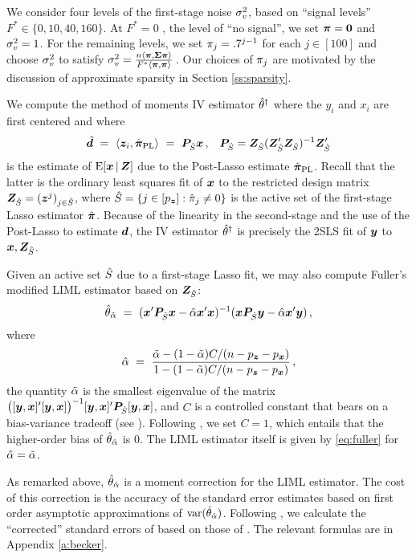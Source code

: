 \documentclass{uwstat572}
\newcommand{\be}{\begin{equation}}
\newcommand{\ee}{\end{equation}}
\newcommand{\benn}{\begin{equation*}}
\newcommand{\eenn}{\end{equation*}}
\theoremstyle{definition}
\theoremstyle{remark}
\newcommand{\E}{\mathrm{E}}
\newcommand{\En}{\mathbb{E}_n}
\newcommand{\var}{\mathrm{var}}
\numberwithin{equation}{section}
\begin{document}
We consider four levels of the first-stage noise $\sigma_v^2$, based on ``signal levels'' $F^* \in \{0, 10, 40, 160\}$. At $F^* = 0$ , the level of ``no signal'', we set $\boldsymbol{\pi} = \boldsymbol{0}$ and $\sigma_v^2 = 1$. For the remaining levels, we set $\pi_j = .7^{j-1}$ for each $j\in[100]$ and choose $\sigma_v^2$ to satisfy $\sigma_v^2 = \frac{n\langle\boldsymbol{\pi}, \boldsymbol{\Sigma}\boldsymbol{\pi} \rangle}{F^*\langle\boldsymbol{\pi}, \boldsymbol{\pi} \rangle}$\,. Our choices of $\pi_j$ are motivated by the discussion of approximate sparsity in Section \ref{ss:sparsity}. 


We compute the method of moments IV estimator $\hat{\theta}^\dagger$
where the $y_i$ and $x_i$ are first centered and where
\vspace{-.7em}
\begin{align*}
 	\hat{\boldsymbol{d}} \ = \ \langle\boldsymbol{z}_i, \hat{\boldsymbol{\pi}}_{\mathrm{PL}}\rangle \ & = \ \boldsymbol{P}_{\hat{S}}\boldsymbol{x}\,, 
	 & \boldsymbol{P}_{\hat{S}} = \boldsymbol{Z}_{\hat{S}} (\boldsymbol{Z}_{\hat{S}}'\boldsymbol{Z}_{\hat{S}})^{-1}\boldsymbol{Z}_{\hat{S}}' 
\end{align*}
is the estimate of $\E[\x\,|\,\Z]$ due to the Post-Lasso estimate $\hat{\boldsymbol{\pi}}_{\mathrm{PL}}$. Recall that the latter is the ordinary least squares fit of $\boldsymbol{x}$ to the restricted design matrix $\boldsymbol{Z}_{\hat{S}} = (\boldsymbol{z}^j)_{j \in \hat{S}}$, where $\hat{S} = \{j\in[{p_{\boldsymbol{z}}}] : \hat{\pi}_j \neq 0\}$ is the active set of the first-stage Lasso estimator $\hat{\boldsymbol{\pi}}$. Because of the linearity in the second-stage and the use of the Post-Lasso to estimate $\boldsymbol{d}$, the IV estimator $\hat{\theta}^\dagger$ is precisely the 2SLS fit of $\boldsymbol{y}$ to $\boldsymbol{x}, \boldsymbol{Z}_{\hat{S}}$. 

Given an active set $\hat{S}$ due to a first-stage Lasso fit, we may also compute Fuller's modified LIML estimator based on $\boldsymbol{Z}_{\hat{S}}$: 
\be\label{eq:fuller}
	\rtfl \ = \ (\x' \PS\x - \fga\x'\x)^{-1}(\x \PS\y - \fga\x'\y) \,,
\ee
where
\be\label{eq:fga}
	\fga \ = \ \frac{\lga - (1 - \lga) C / (n - \pz - \px)}{1 - (1 - \lga) C / (n - \pz - \px)} \,,
\ee
\vspace{.2em}the quantity $\tilde{\alpha}$ is the smallest eigenvalue of the matrix $\big([\boldsymbol{y},\boldsymbol{x}]'[\boldsymbol{y},\boldsymbol{x}]\big)^{-1}[\boldsymbol{y},\boldsymbol{x}]'\boldsymbol{P}_{\hat{S}}[\boldsymbol{y},\boldsymbol{x}]$, and $C$ is a controlled constant that bears on a bias-variance tradeoff (see \cite[Theorem 1, Corollary 2]{F77}). Following \cite{BCH11}, we set $C=1$, which entails that the higher-order bias of $\hat{\theta}_{\hat{\alpha}}$ is 0. The LIML estimator itself is given by \eqref{eq:fuller} for $\hat{\alpha} = \tilde{\alpha}$. 

As remarked above, $\hat{\theta}_{\hat{\alpha}}$ is a moment correction for the LIML estimator. The cost of this correction is the accuracy of the standard error estimates based on first order asymptotic approximations of $\var(\rtfl)$. Following \cite{BCH11}, we calculate the ``corrected'' standard errors of \cite{HHN08} based on those of \cite{B94}. The relevant formulas are in Appendix \ref{a:becker}. 
\end{document}
